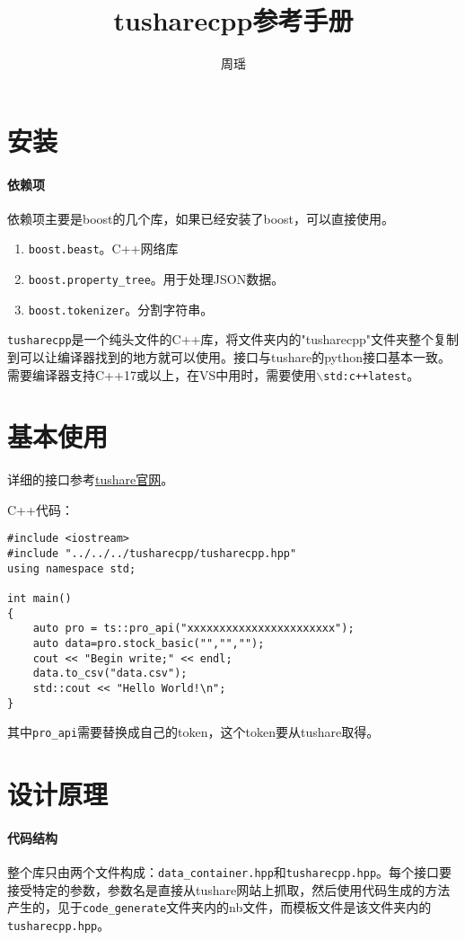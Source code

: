 \documentclass[a4paper, 11pt,UTF8,oneside]{article}
\newcommand{\cd}[1]{\texttt{#1}}
\begin{document}
\title{tusharecpp参考手册}
\author{周瑶}
\maketitle

\section{安装}
\paragraph{依赖项}依赖项主要是boost的几个库，如果已经安装了boost，可以直接使用。
\begin{enumerate}
  \item \cd{boost.beast}。C++网络库
  \item \cd{boost.property\_tree}。用于处理JSON数据。
  \item \cd{boost.tokenizer}。分割字符串。
\end{enumerate}

\cd{tusharecpp}是一个纯头文件的C++库，将文件夹内的"tusharecpp"文件夹整个复制到可以让编译器找到的地方就可以使用。接口与tushare的python接口基本一致。需要编译器支持C++17或以上，在VS中用时，需要使用\cd{$\backslash$std:c++latest}。

\section{基本使用}
详细的接口参考\href{https://tushare.pro/document/2}{tushare官网}。

C++代码：

\begin{tcolorbox}
\begin{lstlisting}
#include <iostream>
#include "../../../tusharecpp/tusharecpp.hpp"
using namespace std;

int main()
{
    auto pro = ts::pro_api("xxxxxxxxxxxxxxxxxxxxxxx");
    auto data=pro.stock_basic("","","");
	cout << "Begin write;" << endl;
    data.to_csv("data.csv");
    std::cout << "Hello World!\n";
}
\end{lstlisting}
\end{tcolorbox}

其中\cd{pro\_api}需要替换成自己的token，这个token要从tushare取得。

\section{设计原理}
\paragraph{代码结构}整个库只由两个文件构成：\cd{data\_container.hpp}和\cd{tusharecpp.hpp}。每个接口要接受特定的参数，参数名是直接从tushare网站上抓取，然后使用代码生成的方法产生的，见于\cd{code\_generate}文件夹内的nb文件，而模板文件是该文件夹内的\cd{tusharecpp.hpp}。
\end{document}
